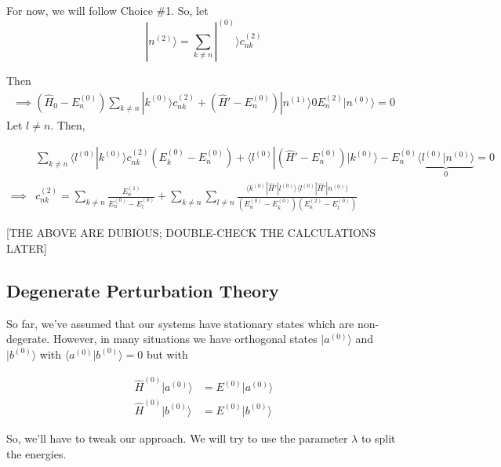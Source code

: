 \documentclass{article}
\newcommand{\ket}[1]{|#1 \rangle}
\newcommand{\inner}[2]{\langle #1 | #2 \rangle}
\begin{document}
\vskip 0.5cm
For now, we will follow Choice \#1. So, let
\[\ket{n^{(2)}} = \sum_{k \neq n} \ket{^{(0)}}  c_{nk}^{(2)} \]

Then 
\begin{align*}
  \implies \left( \hat{H}_0 - E_n^{(0)} \right)\sum_{k \neq n} \ket{k^{(0)}}  c_{nk}^{(2)} + \left( \hat{H}' - E_n^{(0)} \right) \ket{n^{(1)}} 0 E_n^{(2)}\ket{n^{(0)}} = 0
\end{align*}
Let $l \neq n$. Then,

\begin{align*}
  &\sum_{k \neq n} \inner{l^{(0)}}{k^{(0)}}  c_{nk}^{(2)} \left( E_k^{(0)} - E_n^{(0)} \right) + \inner{l^{(0)}}{\left( \hat{H}' - E_n^{(0)} \right) | k^{(0)}} - E_n^{(0)}\underbrace{\inner{l^{(0)}}{n^{(0)}}}_{0} = 0 \\
  \implies &c_{nk}^{(2)} = \sum_{k \neq n} \frac{E_n^{(1)}}{E_n^{(0)} - E_l^{(0)}} + \sum_{k \neq n} \sum_{l \neq n} \frac{\inner{k^{(0)}}{\hat{H}'| l^{(0)}} \inner{l^{(0)}}{\hat{H}'| n^{(0)}} }{(E_n^{(0)} - E_k^{(0)})(E_n^{(2)} - E_l^{(0)})}
\end{align*}

[THE ABOVE ARE DUBIOUS; DOUBLE-CHECK THE CALCULATIONS LATER]

\vskip 1cm
\subsection{Degenerate Perturbation Theory}
So far, we've assumed that our systems have stationary states which are non-degerate. However, in many situations we have orthogonal states $\ket{a^{(0)}}$ and $\ket{b^{(0)}}$ with $\inner{a^{(0)}}{b^{(0)}} = 0$ but with

\begin{align*}
  \hat{H}^{(0)}\ket{a^{(0)}} &= E^{(0)} \ket{a^{(0)}} \\
  \hat{H}^{(0)}\ket{b^{(0)}} &= E^{(0)} \ket{b^{(0)}} 
\end{align*}

So, we'll have to tweak our approach. We will try to use the parameter $\lambda$ to split the energies.
\end{document}
